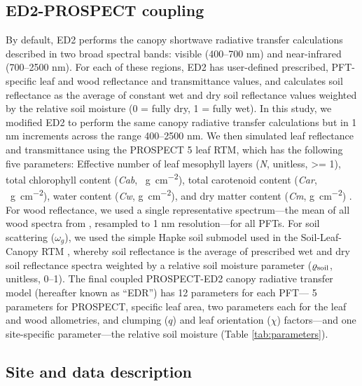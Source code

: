 \subsection{ED2-PROSPECT coupling}\label{subsec:edr-prospect}

By default, ED2 performs the canopy shortwave radiative transfer calculations described in two broad spectral bands:
visible (400--700 \unit{nm}) and near-infrared (700--2500 \unit{nm}).
For each of these regions, ED2 has user-defined prescribed, PFT-specific leaf and wood reflectance and transmittance values, and calculates soil reflectance as the average of constant wet and dry soil reflectance values weighted by the relative soil moisture (0 = fully dry, 1 = fully wet).
In this study, we modified ED2 to perform the same canopy radiative transfer calculations but in 1 \unit{nm} increments across the range 400--2500 \unit{nm}.
We then simulated leaf reflectance and transmittance using the PROSPECT 5 leaf RTM,
which has the following five parameters:
Effective number of leaf mesophyll layers (\emph{N}, unitless, >= 1),
total chlorophyll content (\emph{Cab}, \unit{\mu g ~ cm^{-2}}),
total carotenoid content (\emph{Car}, \unit{\mu g ~ cm^{-2}}),
water content (\emph{Cw}, \unit{g ~ cm^{-2}}),
and dry matter content (\emph{Cm}, \unit{g ~ cm^{-2}})
\citep{feret2008prospect4}.
For wood reflectance, we used a single representative spectrum---the mean of all wood spectra from \citet{asner1998biophysical}, resampled to 1 \unit{nm} resolution---for all PFTs.
For soil scattering ($\omega_{g}$), we used the simple Hapke soil submodel used in the Soil-Leaf-Canopy RTM \citep{verhoef2007coupled}, whereby soil reflectance is the average of prescribed wet and dry soil reflectance spectra weighted by a relative soil moisture parameter ($\varrho_{\mathrm{soil}}$, unitless, 0--1).
The final coupled PROSPECT-ED2 canopy radiative transfer model (hereafter known as ``EDR'') has 12 parameters for each PFT---
5 parameters for PROSPECT, specific leaf area, two parameters each for the leaf and wood allometries, and clumping ($q$) and leaf orientation ($\chi$) factors---and one site-specific parameter---the relative soil moisture (Table \ref{tab:parameters}).

\subsection{Site and data description}\label{subsec:site-data}

